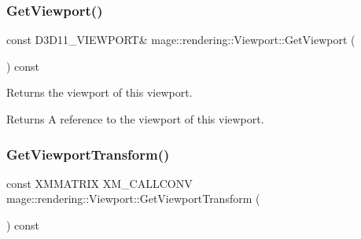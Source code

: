 \hypertarget{classmage_1_1rendering_1_1_viewport_a9b931e5491d44459f598868eee59f1cc}{}\label{classmage_1_1rendering_1_1_viewport_a9b931e5491d44459f598868eee59f1cc} 
\subsubsection{\texorpdfstring{Get\+Viewport()}{GetViewport()}}
{\footnotesize\ttfamily const D3\+D11\+\_\+\+V\+I\+E\+W\+P\+O\+RT\& mage\+::rendering\+::\+Viewport\+::\+Get\+Viewport (\begin{DoxyParamCaption}{ }\end{DoxyParamCaption}) const\hspace{0.3cm}{\ttfamily [noexcept]}}

Returns the viewport of this viewport.

\begin{DoxyReturn}{Returns}
A reference to the viewport of this viewport. 
\end{DoxyReturn}
\hypertarget{classmage_1_1rendering_1_1_viewport_ac4ea113f2c019b5b1d369898537ab5c3}{}\label{classmage_1_1rendering_1_1_viewport_ac4ea113f2c019b5b1d369898537ab5c3} 
\subsubsection{\texorpdfstring{Get\+Viewport\+Transform()}{GetViewportTransform()}}
{\footnotesize\ttfamily const X\+M\+M\+A\+T\+R\+IX X\+M\+\_\+\+C\+A\+L\+L\+C\+O\+NV mage\+::rendering\+::\+Viewport\+::\+Get\+Viewport\+Transform (\begin{DoxyParamCaption}{ }\end{DoxyParamCaption}) const\hspace{0.3cm}{\ttfamily [noexcept]}}

\hypertarget{classmage_1_1rendering_1_1_viewport_a757409f525af58308a58083a9d9e086d}{}\label{classmage_1_1rendering_1_1_viewport_a757409f525af58308a58083a9d9e086d} 
